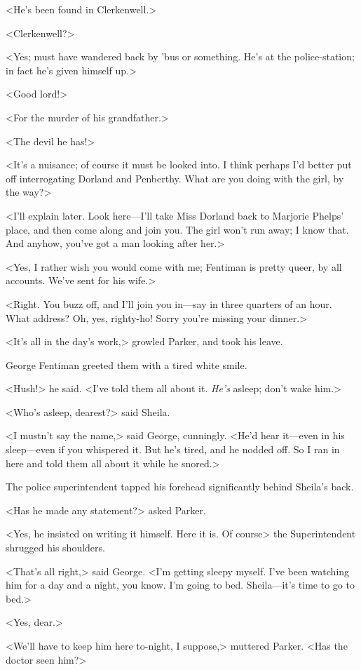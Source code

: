 <He's been found in Clerkenwell.>

<Clerkenwell?>

<Yes; must have wandered back by 'bus or something. He's at the police-station; in fact he's given himself up.>

<Good lord!>

<For the murder of his grandfather.>

<The devil he has!>

<It's a nuisance; of course it must be looked into. I think perhaps I'd better put off interrogating Dorland and Penberthy. What are you doing with the girl, by the way?>

<I'll explain later. Look here—I'll take Miss Dorland back to Marjorie Phelps' place, and then come along and join you. The girl won't run away; I know that. And anyhow, you've got a man looking after her.>

<Yes, I rather wish you would come with me; Fentiman is pretty queer, by all accounts. We've sent for his wife.>

<Right. You buzz off, and I'll join you in—say in three quarters of an hour. What address? Oh, yes, righty-ho! Sorry you're missing your dinner.>

<It's all in the day's work,> growled Parker, and took his leave.

George Fentiman greeted them with a tired white smile.

<Hush!> he said. <I've told them all about it. \emph{He's} asleep; don't wake him.>

<Who's asleep, dearest?> said Sheila.

<I mustn't say the name,> said George, cunningly. <He'd hear it—even in his sleep—even if you whispered it. But he's tired, and he nodded off. So I ran in here and told them all about it while he snored.>

The police superintendent tapped his forehead significantly behind Sheila's back.

<Has he made any statement?> asked Parker.

<Yes, he insisted on writing it himself. Here it is. Of course\longdots> the Superintendent shrugged his shoulders.

<That's all right,> said George. <I'm getting sleepy myself. I've been watching him for a day and a night, you know. I'm going to bed. Sheila—it's time to go to bed.>

<Yes, dear.>

<We'll have to keep him here to-night, I suppose,> muttered Parker. <Has the doctor seen him?>

